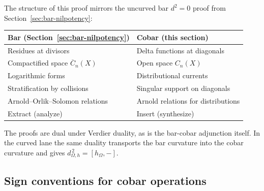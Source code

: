 \begin{remark}[Duality with the uncurved bar
\texorpdfstring{$d^2=0$}{d\textasciicircum 2=0} proof]\label{rem:bar-cobar-d2-duality}
The structure of this proof mirrors the uncurved bar $d^2=0$ proof from
Section~\ref{sec:bar-nilpotency}:

\begin{center}
\begin{tabular}{l|l}
\textbf{Bar (Section~\ref{sec:bar-nilpotency})} & \textbf{Cobar (this section)} \\ \hline
Residues at divisors & Delta functions at diagonals \\
Compactified space $\overline{C}_n(X)$ & Open space $C_n(X)$ \\
Logarithmic forms & Distributional currents \\
Stratification by collisions & Singular support on diagonals \\
Arnold--Orlik--Solomon relations & Arnold relations for distributions \\
Extract (analyze) & Insert (synthesize) \\
\end{tabular}
\end{center}

The proofs are dual under Verdier duality, as is the bar-cobar
adjunction itself. In the curved lane the same duality transports the
bar curvature into the cobar curvature and gives
$d_{\Omega,h}^{\,2}=[h_\Omega,-]$.
\end{remark}

\subsection{Sign conventions for cobar operations}


